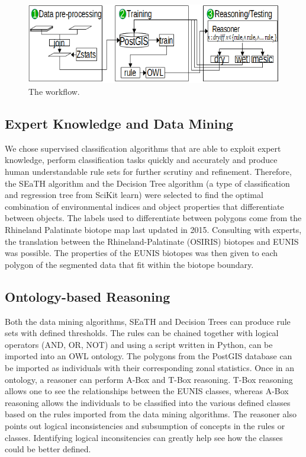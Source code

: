 \documentclass[authoryear, review,12pt,number]{elsarticle}
\begin{document}
\begin{figure}
  \includegraphics[width=\linewidth]{diagrams/workflow_overview2.png}
\caption{The workflow.}
\end{figure}

\subsection{Expert Knowledge and Data Mining}
We chose supervised classification algorithms that are able to exploit expert
knowledge, perform classification tasks quickly and accurately and produce human
understandable rule sets for further scrutiny and refinement. Therefore, the
SEaTH algorithm and the Decision Tree algorithm (a type of classification and regression
tree from SciKit learn) were selected to find the optimal combination of environmental indices and
object properties that differentiate between objects. The labels used to
differentiate between polygons come from the Rhineland Palatinate biotope map
last updated in 2015. Consulting with experts, the translation between the
Rhineland-Palatinate (OSIRIS) biotopes and EUNIS was possible. The properties of
the EUNIS biotopes was then given to each polygon of the segmented data that
fit within the biotope boundary.
\subsection{Ontology-based Reasoning}
Both the data mining algorithms, SEaTH and Decision Trees can produce rule
sets with defined thresholds. The rules can be chained together with logical
operators (AND, OR, NOT) and using a script written in Python, can be imported
into an OWL ontology. The polygons from the PostGIS database can be imported
as individuals with their corresponding zonal statistics. Once in an ontology, a
reasoner can perform A-Box and T-Box reasoning. T-Box reasoning allows one
to see the relationships between the EUNIS classes, whereas A-Box reasoning
allows the individuals to be classified into the various defined classes based
on the rules imported from the data mining algorithms. The reasoner also
points out logical inconsistencies and subsumption of concepts in the rules or
classes. Identifying logical inconsitencies can greatly help see how the classes
could be better defined.
\end{document}
